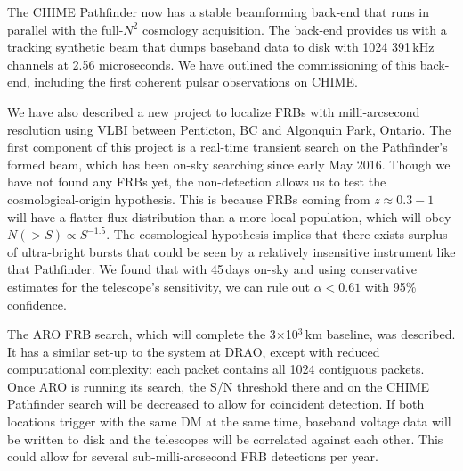 The CHIME Pathfinder now has a stable beamforming back-end
that runs in parallel with the full-$N^2$ cosmology acquisition.
The back-end provides us with a tracking synthetic beam that 
dumps baseband data to disk with 1024 391\,kHz channels at 
2.56 microseconds. We have outlined the commissioning of this 
back-end, including the first coherent pulsar observations on CHIME.

We have also described a new project to localize FRBs with 
milli-arcsecond resolution using VLBI between Penticton, BC 
and Algonquin Park, Ontario. The first component 
of this project is a real-time transient search on the Pathfinder's 
formed beam, which has been on-sky searching since early May 2016. 
Though we have not found any FRBs yet, the non-detection 
allows us to test the cosmological-origin hypothesis. This is 
because FRBs coming from $z\approx0.3-1$ will have a flatter 
flux distribution than a more local population, which 
will obey $N(>S)\propto S^{-1.5}$. The cosmological hypothesis implies that 
there exists surplus of ultra-bright bursts that could be 
seen by a relatively insensitive instrument like that Pathfinder.
We found that with 45\,days on-sky and using conservative 
estimates for the telescope's sensitivity, we can rule 
out $\alpha < 0.61$ with 95\% confidence. 

The ARO FRB search, which will complete the 3$\times$10$^3$\,km
baseline, was described. It has a similar set-up to the 
system at DRAO, except with reduced computational 
complexity: each packet contains all 1024 contiguous 
packets. Once ARO is running its search, the S/N threshold 
there and on the CHIME Pathfinder search will be decreased
to allow for coincident detection. If both locations 
trigger with the same DM at the same time, baseband voltage 
data will be written to disk and the telescopes 
will be correlated against each other. This could 
allow for several sub-milli-arcsecond FRB detections 
per year.





  

